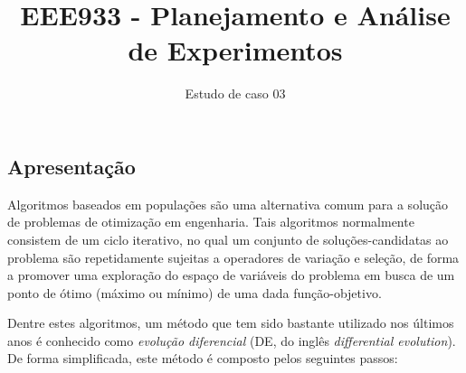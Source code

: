 \documentclass[11pt,twoside,printwatermark=false]{pinp}
\title{EEE933 - Planejamento e Análise de Experimentos}
\author[]{Estudo de caso 03}
\begin{document}
\verticaladjustment{-2pt}

\maketitle
\thispagestyle{firststyle}



\subsection{Apresentação}\label{apresentacao}

Algoritmos baseados em populações são uma alternativa comum para a
solução de problemas de otimização em engenharia. Tais algoritmos
normalmente consistem de um ciclo iterativo, no qual um conjunto de
soluções-candidatas ao problema são repetidamente sujeitas a operadores
de variação e seleção, de forma a promover uma exploração do espaço de
variáveis do problema em busca de um ponto de ótimo (máximo ou mínimo)
de uma dada função-objetivo.

Dentre estes algoritmos, um método que tem sido bastante utilizado nos
últimos anos é conhecido como \emph{evolução diferencial} (DE, do inglês
\emph{differential evolution})\citep{Storn1997}. De forma simplificada,
este método é composto pelos seguintes passos:
\end{document}
